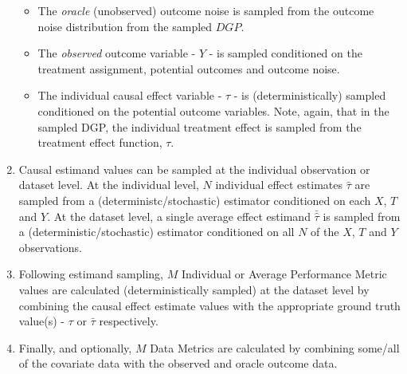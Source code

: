 \documentclass[../main.tex]{subfiles}
\begin{document}
\begin{enumerate}
\begin{itemize}
   \item The \textit{oracle} (unobserved) outcome noise is sampled from the outcome noise distribution from the sampled $DGP$.

   \item The \textit{observed} outcome variable - $Y$ - is sampled conditioned on the treatment assignment, potential outcomes and outcome noise.
    
   \item The individual causal effect variable - $\tau$ - is (deterministically) sampled conditioned on the potential outcome variables. Note, again, that in the sampled DGP, the individual treatment effect is sampled from the treatment effect function, $\tau$.
  
\end{itemize}

\item Causal estimand values can be sampled at the individual observation or dataset level. At the individual level, $N$ individual effect estimates $\hat{\tau}$ are sampled from a (deterministc/stochastic) estimator conditioned on each $X$, $T$ and $Y$. At the dataset level, a single average effect estimand $\bar{\hat{\tau}}$ is sampled from a (deterministic/stochastic) estimator conditioned on all $N$ of the $X$, $T$ and $Y$ observations.

\item Following estimand sampling, $M$ Individual or Average Performance Metric values are calculated (deterministically sampled) at the dataset level by combining the causal effect estimate values with the appropriate ground truth value(s) - $\tau$ or $\bar{\tau}$ respectively.

\item Finally, and optionally, $M$ Data Metrics are calculated by combining some/all of the covariate data with the observed and oracle outcome data.

\end{enumerate}
\end{document}
